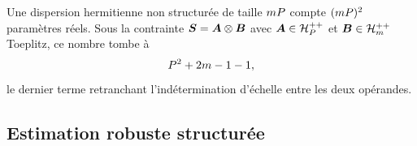 
\begin{proposition}
\label{prop:detection-fls-comptage}
  Une dispersion hermitienne non structurée de taille $mP$ compte $(mP)^2$ paramètres réels. Sous la contrainte $\boldsymbol{S}=\boldsymbol{A}\otimes\boldsymbol{B}$ avec $\boldsymbol{A}\in\mathcal{H}_{P}^{++}$ et $\boldsymbol{B}\in\mathcal{H}_{m}^{++}$ Toeplitz, ce nombre tombe à
  \begin{equation}
    P^2 + 2m - 1 - 1,
    \label{eq:detection-fls-comptage}
  \end{equation}
  le dernier terme retranchant l'indétermination d'échelle entre les deux opérandes.
\end{proposition}


\subsection{Estimation robuste structurée}
\label{subsec:detection-fls-estimation}

